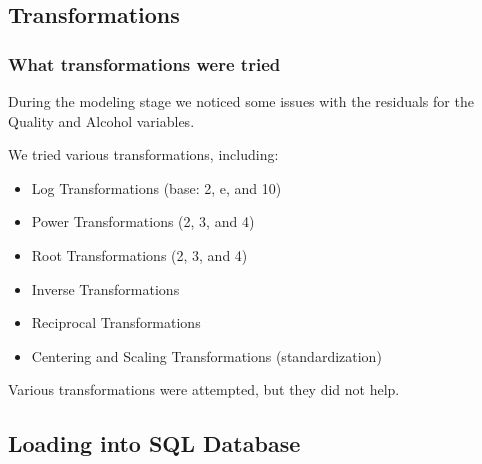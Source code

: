 \documentclass{beamer}
\begin{document}
	
	\subsection{Transformations}
	\begin{frame}
		\frametitle{What transformations were tried}
		During the modeling stage we noticed some issues with the residuals for the Quality and Alcohol variables.  \par
		\vspace{10pt}
		We tried various transformations, including:  
		\begin{itemize}
			\item Log Transformations (base: 2, e, and 10)
			\item Power Transformations (2, 3, and 4)
			\item Root Transformations (2, 3, and 4)
			\item Inverse Transformations
			\item Reciprocal Transformations
			\item Centering and Scaling Transformations (standardization)
		\end{itemize}
	\vspace{10pt}
			Various transformations were attempted, but they did not help.  \par
	\end{frame}

	\subsection{Loading into SQL Database}
	
\end{document}
